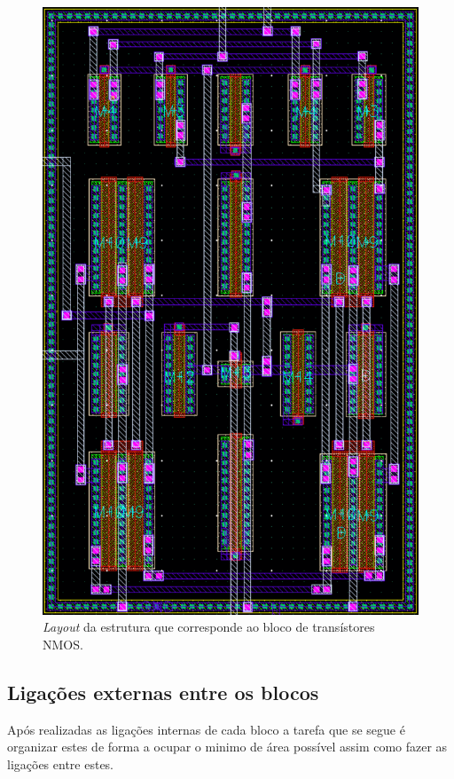 \documentclass[11pt]{article}
\numberwithin{equation}{section}
\begin{document}
\begin{figure}[H]
	\centering
	\includegraphics[keepaspectratio=true, scale=0.50]{exps/layout/nmos}
	\vspace{-0.5em}
	\caption{\textit{Layout} da estrutura que corresponde ao bloco de transístores NMOS.}
	\vspace{-0.8em} 
\end{figure}

\subsection{Ligações externas entre os blocos}

Após realizadas as ligações internas de cada bloco a tarefa que se segue é organizar estes de forma a ocupar o minimo de área possível assim como fazer as ligações entre estes.
\end{document}
